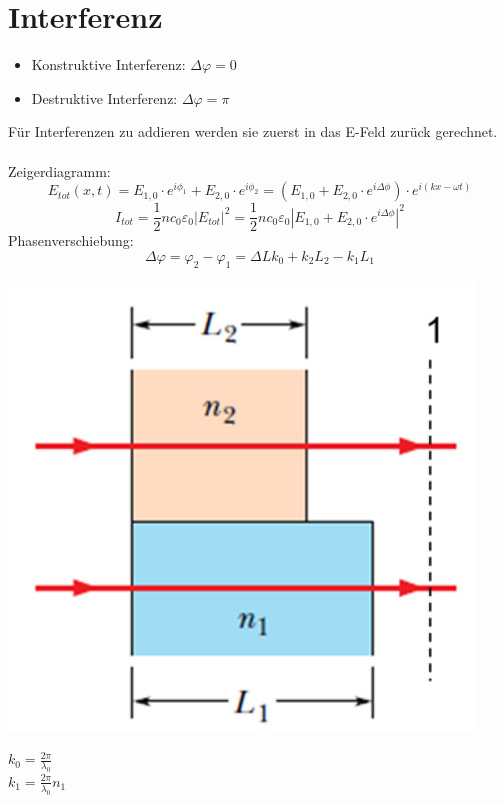 \section{Interferenz}
\begin{itemize}
	\item Konstruktive Interferenz: $\Delta\varphi=0$
	\item Destruktive Interferenz:  $\Delta\varphi=\pi$\\
\end{itemize}
Für Interferenzen zu addieren werden sie zuerst in das E-Feld zurück gerechnet.
\\
\\
Zeigerdiagramm:
\[
	E_{tot}(x,t)=E_{1,0}\cdot e^{i\phi_1}+E_{2,0}\cdot e^{i\phi_2}= (E_{1,0}+E_{2,0}\cdot e^{i\Delta\phi})\cdot e^{i(kx-\omega t)}
\]
\[
	I_{tot}= \frac{1}{2}nc_0\varepsilon_0|E_{tot}|^2 =
	\frac{1}{2}nc_0\varepsilon_0|E_{1,0}+E_{2,0}\cdot e^{i\Delta \phi}|^2
\]
Phasenverschiebung:
\[
	\Delta\varphi=\varphi_2-\varphi_1= 
	\Delta L k_0+k_2L_2-k_1L_1 
\]
\begin{center}
	\includegraphics[scale = 0.2]{images/phasenverschiebung.jpg}
\end{center}
\begin{footnotesize}
	$k_0=\frac{2\pi}{\lambda_0}$\\
	$k_1=\frac{2\pi}{\lambda_0} n_1$\\
\end{footnotesize}
\\
